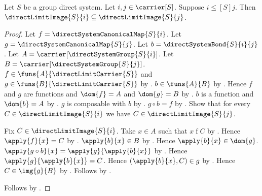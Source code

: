 \begin{theorem}\label{direct_limit_images_nested}
    Let $S$ be a group direct system.
    Let $i,j\in\carrier[S]$.
    Suppose $i\mathrel{\leq[S]}j$.
    Then $\directLimitImage{S}{i}\subseteq
        \directLimitImage{S}{j}$.
\end{theorem}
\begin{proof}
    Let $f=\directSystemCanonicalMap{S}{i}$.
    Let $g=\directSystemCanonicalMap{S}{j}$.
    Let $b=\directSystemBond{S}{i}{j}$.
    Let $A=\carrier[\directSystemGroup{S}{i}]$.
    Let $B=\carrier[\directSystemGroup{S}{j}]$.
    $f\in\funs{A}{\directLimitCarrier{S}}$ and
        $g\in\funs{B}{\directLimitCarrier{S}}$ by
        .
    $b\in\funs{A}{B}$ by
        .
    Hence $f$ and $g$ are functions and $\dom{f}=A$ and
        $\dom{g}=B$ by
        .
    $b$ is a function and $\dom{b}=A$ by
        .
    $g$ is composable with $b$ by
        .
    $g\circ b=f$ by
        .
    Show that for every $C\in\directLimitImage{S}{i}$ we have
        $C\in\directLimitImage{S}{j}$.
    \begin{subproof}
        Fix $C\in\directLimitImage{S}{i}$.
        Take $x\in A$ such that $x\mathrel{f}C$ by
            .
        Hence $\apply{f}{x}=C$ by
            .
        $\apply{b}{x}\in B$ by
            .
        Hence $\apply{b}{x}\in\dom{g}$.
        $\apply{g\circ b}{x}=\apply{g}{\apply{b}{x}}$ by
            .
        Hence $\apply{g}{\apply{b}{x}}=C$.
        Hence $(\apply{b}{x},C)\in g$ by
            .
        Hence $C\in\img{g}{B}$ by
            .
        Follows by .
    \end{subproof}
    Follows by .
\end{proof}

